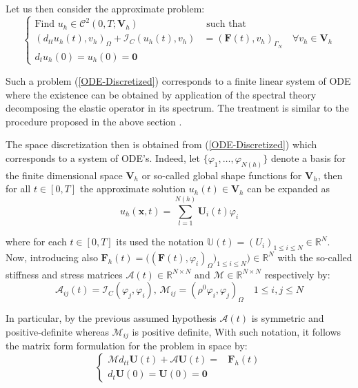 Let us then consider the approximate problem:
\begin{equation}
\label{ODE-Discretized}
    \left \{
    \begin{array}{cc}
        \text{Find } u_h \in \mathcal{C}^2(0,T; \mathbf{V}_h) & \text{ such that } \\
        (d_{tt} u_h(t), v_h)_{\Omega} + \mathcal{I}_C(u_h(t), v_h) & = (\mathbf{F}(t), v_h)_{\Gamma_N} \quad \forall v_h \in \mathbf{V}_h\\
        d_t u_h(0) = u_h(0) = \mathbf{0} & 
    \end{array}
    \right. 
\end{equation}

Such a problem (\ref{ODE-Discretized}) corresponds to a finite linear system of ODE where the existence can be obtained by application of the spectral theory decomposing the elastic operator in its spectrum. The treatment is similar to the procedure proposed in the above section \cite{raviart1983introduction}.

The space discretization then is obtained from (\ref{ODE-Discretized}) which corresponds to a system of ODE's. Indeed, let $\{ \varphi_1, \dots, \varphi_{N(h)} \}$ denote a basis for the finite dimensional space $\mathbf{V}_h$ or so-called global shape functions for $\mathbf{V}_h$, then for all $t \in [0,T]$ the approximate solution $u_h(t) \in \mathbf{V}_h$ can be expanded as
\begin{equation*}
    u_h(\mathbf{x},t) = \sum \limits_{l=1}^{N(h)} \mathbf{U}_i(t) \varphi_i
\end{equation*}

where for each $t \in [0,T]$ its used the notation $\mathbb{U}(t) = (U_i)_{1 \leq i \leq N} \in \mathbb{R}^N$. Now, introducing also $\mathbf{F}_h(t) = \big( (\mathbf{F}(t), \varphi_i)_{\Omega} \big)_{1 \leq i \leq N} \big) \in \mathbb{R}^N$ with the so-called stiffness and stress matrices $\mathcal{A}(t) \in \mathbb{R}^{N \times N}$ and $\mathcal{M} \in \mathbb{R}^{N \times N}$ respectively by:
\begin{equation*}
    \mathcal{A}_{ij}(t) = \mathcal{I}_C(\varphi_j, \varphi_i), \, \mathcal{M}_{ij} = (\rho^0 \varphi_i , \varphi_j)_{\Omega} \quad 1 \leq i,j \leq N
\end{equation*}

In particular, by the previous assumed hypothesis $\mathcal{A}(t)$ is symmetric and positive-definite whereas $\mathcal{M}_{ij}$ is positive definite,
With such notation, it follows the matrix form formulation for the problem in space by:
\begin{equation}
    \label{MatrixFormulation}
    \left \{
    \begin{array}{cc}
        \mathcal{M} d_{tt} \mathbf{U}(t) + \mathcal{A} \mathbf{U}(t) = & \mathbf{F}_h (t)  \\
        d_{t} \mathbf{U}(0) = \mathbf{U}(0)  = \mathbf{0}&
    \end{array}
    \right.
\end{equation}

